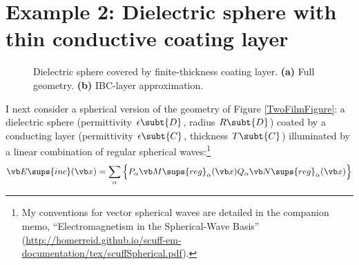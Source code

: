 \documentclass{article}
\begin{document}
\section{Example 2: Dielectric sphere with thin conductive coating layer}

\begin{figure}[H]
\caption{Dielectric sphere covered by finite-thickness coating layer.
\textbf{(a)} Full geometry.
\textbf{(b)} IBC-layer approximation.
}
\label{CoatedSphereFigure}
\end{figure}
I next consider a spherical version of the geometry of Figure
\ref{TwoFilmFigure}: a dielectric sphere (permittivity
$\epsilon\subt{D}$, radius $R\subt{D}$) coated by a
conducting layer (permittivity $\epsilon\subt{C}$, thickness
$T\subt{C}$) illuminated by a linear combination of regular
spherical waves:\footnote{My conventions for vector spherical
waves are detailed in the companion memo,
``Electromagnetism in the Spherical-Wave Basis''
(\url{http://homerreid.github.io/scuff-em-documentation/tex/scuffSpherical.pdf}).}
$$ \vb E\sups{inc}(\vb x)=
   \sum_{\alpha}
     \Big\{ P_\alpha\vb M\sups{reg}_\alpha(\vb x)
            Q_\alpha\vb N\sups{reg}_\alpha(\vb x)
     \Big\}
$$
\end{document}
